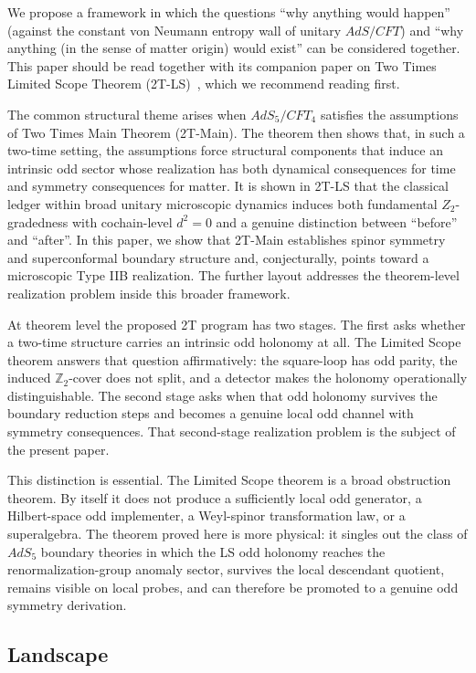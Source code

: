 \documentclass[
  aps,
  prd,
  onecolumn,
  notitlepage,
  nofootinbib,
  superscriptaddress,
  10pt
]{revtex4-2}
\theoremstyle{definition}
\theoremstyle{plain}
\begin{document}
We propose a framework in which the questions ``why anything would happen''
(against the constant von Neumann entropy wall of unitary \(AdS/CFT\)) and
``why anything (in the sense of matter origin) would exist'' can be considered
together. This paper should be read together with its companion paper on Two Times Limited Scope Theorem (2T-LS)~\cite{Surdu2TLSLetter2026}, which we recommend reading first.

The common structural theme arises when \(AdS_5/CFT_4\) satisfies the assumptions of Two Times Main Theorem (2T-Main). The theorem then shows that, in such a two-time setting, the assumptions force structural components that induce an intrinsic odd sector whose realization has both dynamical consequences for time and symmetry consequences for matter.
It is shown in 2T-LS that the classical ledger within broad unitary microscopic dynamics induces both fundamental \(Z_2\)-gradedness with cochain-level \(d^2=0\) and a genuine distinction between ``before'' and ``after''. In this paper, we show that 2T-Main establishes spinor symmetry and superconformal boundary structure and, conjecturally, points toward a microscopic Type IIB realization.  The further layout addresses the theorem-level realization problem inside this broader framework.

At theorem level the proposed 2T program has two stages.  The first asks whether a two-time
structure carries an intrinsic odd holonomy at all.  The Limited Scope theorem
answers that question affirmatively: the square-loop has odd parity, the
induced \(\mathbb Z_2\)-cover does not split, and a detector makes the
holonomy operationally distinguishable.  The second
stage asks when that odd holonomy survives the boundary reduction
steps and becomes a genuine local odd channel with symmetry consequences.  That
second-stage realization problem is the subject of the present paper.

This distinction is essential.  The Limited Scope theorem is a broad
obstruction theorem.  By itself it does not produce a sufficiently local odd
generator, a Hilbert-space odd implementer, a Weyl-spinor transformation law,
or a superalgebra.  The theorem proved here is more physical: it
singles out the class of \(AdS_5\) boundary theories in which the LS odd
holonomy reaches the renormalization-group anomaly sector, survives the local
descendant quotient, remains visible on local probes, and can therefore be
promoted to a genuine odd symmetry derivation.

\subsection{Landscape}
\end{document}
